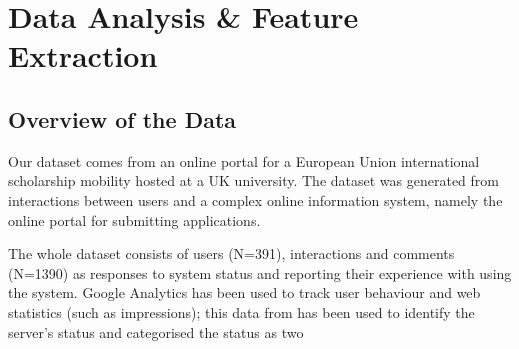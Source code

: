 \documentclass[graybox]{svmult}
\begin{document}
\section{Data Analysis \& Feature Extraction}\label{dataanalysis}

\subsection{Overview of the Data}

Our dataset comes from an online portal for a European Union 
international scholarship mobility hosted at a UK university. The
dataset was generated from interactions between users and a complex
online information system, namely the online portal for submitting
applications.

The whole dataset consists of users (N=391), interactions and comments
(N=1390) as responses to system status and reporting their experience
with using the system. Google Analytics has been used to track user behaviour
and web statistics (such as impressions); this data from has been used
to identify the server's status and categorised the status as two
\end{document}
